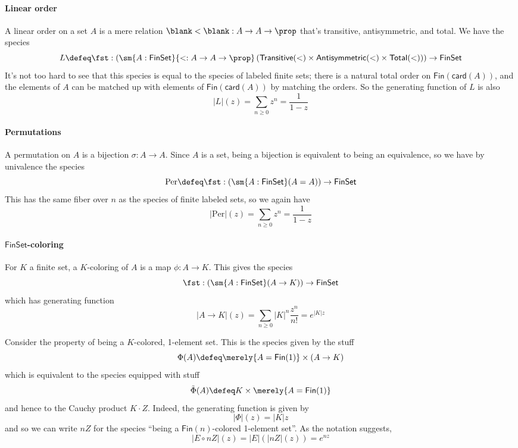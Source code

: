 \documentclass[fleqn]{article}
\newcommand{\card}{\mathsf{card}}
\newcommand{\gf}[1]{\abs{#1}\!(z)}
\newcommand{\fin}{\mathsf{Fin}}
\newcommand{\finset}{\mathsf{FinSet}}
\newcommand{\abs}[1]{\left\lvert #1 \right\rvert}
\theoremstyle{theorem}
\theoremstyle{definition}
\begin{document}
\paragraph{Linear order}
A linear order on a set $A$ is a mere relation $\blank < \blank : A \to A \to
\prop$ that's transitive, antisymmetric, and total.  We have the species
\[
  L \defeq \fst : \left(
    \sm{A:\finset}{< : A \to A \to \prop}\left(
      \mathsf{Transitive}(<)
      \times \mathsf{Antisymmetric}(<)
      \times \mathsf{Total}(<)
    \right)
  \right)
  \to
  \finset
\]
It's not too hard to see that this species is equal to the species of labeled
finite sets; there is a natural total order on $\fin(\card(A))$, and the
elements of $A$ can be matched up with elements of $\fin(\card(A))$ by matching
the orders.  So the generating function of $L$ is also
\[
  \gf{L} = \sum_{n\geq0}z^{n} = \frac{1}{1-z}
\]

\paragraph{Permutations}
A permutation on $A$ is a bijection $\sigma : A \to A$.  Since $A$ is a set,
being a bijection is equivalent to being an equivalence, so we have by
univalence the species
\[
  \mathrm{Per} \defeq \fst : \left(
    \sm{A : \finset}(A = A)
  \right) \to \finset
\]
This has the same fiber over $n$ as the species of finite labeled sets, so we
again have
\[
  \gf{\mathrm{Per}} = \sum_{n\geq0}z^{n} = \frac{1}{1-z}
\]

\paragraph{$\finset$-coloring}
For $K$ a finite set, a $K$-coloring of $A$ is a map $\phi : A \to K$.  This gives the
species
\[
  \fst : \left(
    \sm{A : \finset}(A \to K)
  \right) \to \finset
\]
which has generating function
\[
  \gf{A \to K} = \sum_{n\geq0} \abs{K}^{n}\frac{z^{n}}{n!}
  = e^{\abs{K}z}
\]

Consider the property of being a $K$-colored, 1-element set.  This is the
species given by the stuff
\[
  \Phi(A) \defeq \merely{A = \fin(1)} \times (A \to K)
\]
which is equivalent to the species equipped with stuff
\[
  \tilde{\Phi}(A) \defeq K \times \merely{A = \fin(1)}
\]
and hence to the Cauchy product $K \cdot Z$.  Indeed, the generating function
is given by
\[
  \gf{\Phi} = \abs{K}z
\]
and so we can write $nZ$ for the species ``being a $\fin(n)$-colored 1-element
set''.  As the notation suggests,
\[
  \gf{E \circ nZ} = \abs{E}\!(\gf{nZ}) = e^{nz}
\]
\end{document}
